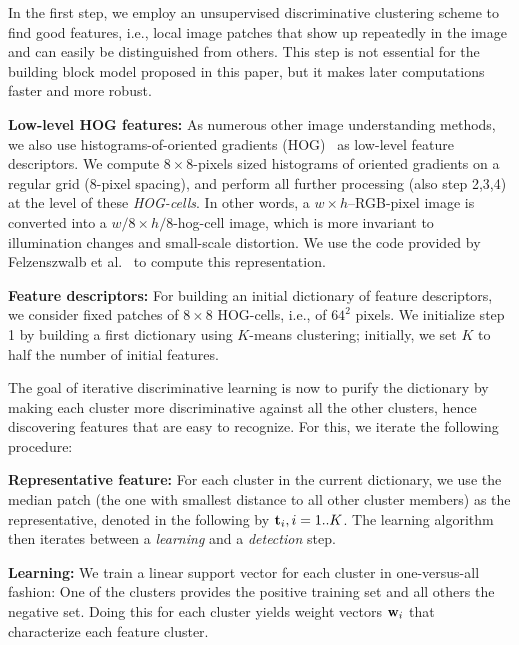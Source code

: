 \documentclass{acmtog}
\begin{document}
In the first step, we employ an unsupervised discriminative clustering scheme to find good features, i.e., local image patches that show up repeatedly in the image and can easily be distinguished from others. This step is not essential for the building block model proposed in this paper, but it makes later computations faster and more robust. %

\textbf{Low-level HOG features:} As numerous other image understanding methods, we also use histograms-of-oriented gradients (HOG)~\cite{DALALcvpr2005} as low-level feature descriptors. We compute $8\times 8$-pixels sized histograms of oriented gradients on a regular grid (8-pixel spacing), and perform all further processing (also step 2,3,4) at the level of these \emph{HOG-cells}. In other words, a $w \times h$--RGB-pixel image is converted into a $w/8 \times h/8$-hog-cell image, which is more invariant to illumination changes and small-scale distortion. We use the code provided by Felzenszwalb et al.~ to compute this representation.

\textbf{Feature descriptors:} For building an initial dictionary of feature descriptors, we consider fixed patches of $8 \times 8$ HOG-cells, i.e., of $64^2$ pixels. We initialize step 1 by building a first dictionary using $K$-means clustering; initially, we set $K$ to half the number of initial features.

The goal of iterative discriminative learning is now to purify the dictionary by making each cluster more discriminative against all the other clusters, hence discovering features that are easy to recognize. For this, we iterate the following procedure:
 
\textbf{Representative feature:} For each cluster in the current dictionary, we use the median patch (the one with smallest distance to all other cluster members) as the representative, denoted in the following by $\mathbf{t}_i, i = 1..K$. The learning algorithm then iterates between a \emph{learning} and a \emph{detection} step.

\textbf{Learning:} We train a linear support vector for each cluster in one-versus-all fashion: One of the clusters provides the positive training set and all others the negative set. Doing this for each cluster yields weight vectors $\mathbf{w}_i$ that characterize each feature cluster.
\end{document}
